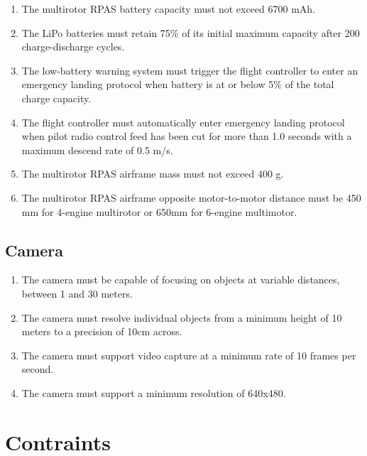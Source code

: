 \documentclass[10pt,letterpaper]{article}
\begin{document}
\begin{enumerate}[label=NF.DR.\arabic*, wide=1cm, widest=3cm, leftmargin=*, font=\bfseries, noitemsep,topsep=0pt, parsep=4pt, partopsep=0pt]
	\item The multirotor RPAS battery capacity must not exceed 6700 mAh.
	\item The LiPo batteries must retain 75\% of its initial maximum capacity after 200 charge-discharge cycles.\cite{lipobattery}
	\item The low-battery warning system must trigger the flight controller to enter an emergency landing protocol when battery is at or below 5\% of the total charge capacity.
	\item The flight controller must automatically enter emergency landing protocol when pilot radio control feed has been cut for more than 1.0 seconds with a maximum descend rate of 0.5 m/s.
	\item The multirotor RPAS airframe mass must not exceed 400 g.
	\item The multirotor RPAS airframe opposite motor-to-motor distance must be 450 mm for 4-engine multirotor or 650mm for 6-engine multimotor.
\end{enumerate}

\subsection{Camera}
\begin{enumerate}[label=NF.CAM.\arabic*, wide=1cm, widest=3cm, leftmargin=*, font=\bfseries, noitemsep,topsep=0pt, parsep=4pt, partopsep=0pt]
	\item The camera must be capable of focusing on objects at variable distances, between 1 and 30 meters.
	\item The camera must resolve individual objects from a minimum height of 10 meters to a precision of 10cm across.
	\item The camera must support video capture at a minimum rate of 10 frames per second.
	\item The camera must support a minimum resolution of 640x480.
\end{enumerate}


\section{Contraints}

\end{document}
